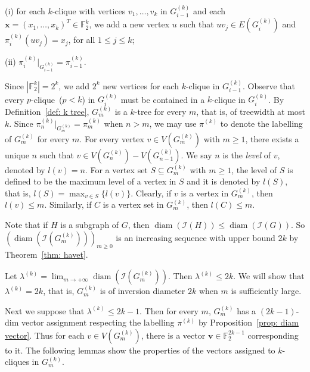 \documentclass[
final
]{dmtcs-episciences}
\DeclareMathOperator{\diam}{\mathrm{diam}}
\begin{document}
(i) for each $k$-clique with vertices $v_1,\ldots,v_k$ in $G_{i-1}^{(k)}$ and each $\mathbf{x} ={(x_1,\ldots,x_k)}^T\in \mathbb{F}_2^{k}$, we add  a new vertex $u$ such that $uv_j\in E(G_i^{(k)})$ and  $\pi_i^{(k)}(u v_j) = x_j$, for all $1\le j\le k$;

(ii) $\pi^{(k)}_{i} |_{G^{(k)}_{i-1}} = \pi^{(k)}_{i-1}$.


Since $|\mathbb{F}_2^{k}|=2^k$, we add $2^k$ new vertices for each $k$-clique in $G_{i-1}^{(k)}$. 
Observe that every $p$-clique~($p < k$) in $G_{i}^{(k)}$ must be contained in a $k$-clique in $G_{i}^{(k)}$.
By Definition~\ref{def: k tree}, $G_m^{(k)}$ is a $k$-tree for every $m$, that is, of treewidth at most $k$.
Since $\pi^{(k)}_{n} |_{G^{(k)}_{m}} = \pi^{(k)}_{m}$ when $n > m$, we may use $\pi^{(k)}$ to denote the labelling of $G^{(k)}_{m}$ for every $m$. For every vertex $v \in V(G^{(k)}_{m})$ with $m\ge 1$, there exists a unique $n$ such that $v \in V(G^{(k)}_n) - V(G^{(k)}_{n-1})$.
We say $n$ is the \emph{level} of $v$, denoted by $l(v) = n$.
For a vertex set $S \subseteq G^{(k)}_{m}$ with $m\ge 1$, the level of $S$ is defined to be the maximum level of a vertex in $S$ and it is denoted by $l(S)$, that is, $l(S) = \max_{v \in S} \{l(v)\}$.
Clearly, if $v$ is a vertex in $G_{m}^{(k)}$, then $l(v) \le m$.
Similarly, if $C$ is a vertex set in $G_{m}^{(k)}$, then $l(C) \le m$.



Note that if $H$ is a subgraph of $G$, then $\diam(\mathcal{I}(H)) \le \diam(\mathcal{I}(G))$.
So ${(\diam(\mathcal{I}(G_m^{(k)})))}_{m \ge 0}$ is an increasing sequence with upper bound $2k$ by Theorem~\ref{thm: havet}.

Let $\lambda^{(k)} = \lim_{m \rightarrow +\infty} \diam(\mathcal{I}(G_m^{(k)}))$.
Then $\lambda^{(k)} \le 2k$.
We will show that $\lambda^{(k)} = 2k$, that is, $G_m^{(k)}$ is of inversion diameter $2k$ when $m$ is sufficiently large.

Next we suppose that $\lambda^{(k)} \le 2k-1$. Then for every $m$, $G_m^{(k)}$  has a $(2k-1)$-dim vector assignment respecting the labelling $\pi^{(k)}$ by Proposition~\ref{prop: diam vector}. Thus for each $v\in V(G_m^{(k)})$, there is a vector $\mathbf{v}\in \mathbb{F}_2^{2k-1}$ corresponding to it.
The following lemmas show the properties of the vectors assigned to $k$-cliques in $G^{(k)}_{m}$.
\end{document}
